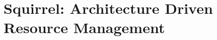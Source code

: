 \chapter{Squirrel: Architecture Driven Resource Management}
\label{chp:squirrel}



%



%







%



